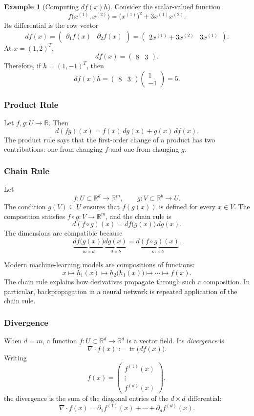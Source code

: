 \documentclass[12pt,oneside]{book}
\numberwithin{equation}{section}
\theoremstyle{definition}
\newtheorem{example}{Example}[section]
\theoremstyle{plain}
\theoremstyle{remark}
\newcommand{\R}{\mathbb{R}}
\newcommand{\tr}{\operatorname{tr}}
\begin{document}
\begin{example}[Computing $df(x)h$]
Consider the scalar-valued function
\[
f\bigl(x^{(1)},x^{(2)}\bigr)
=\bigl(x^{(1)}\bigr)^2+3x^{(1)}x^{(2)}.
\]
Its differential is the row vector
\[
df(x)
=\begin{pmatrix}\partial_1 f(x)&\partial_2 f(x)\end{pmatrix}
=\begin{pmatrix}2x^{(1)}+3x^{(2)}&3x^{(1)}\end{pmatrix}.
\]
At $x=(1,2)^T$,
\[
df(x)=\begin{pmatrix}8&3\end{pmatrix}.
\]
Therefore, if $h=(1,-1)^T$, then
\[
df(x)h
=\begin{pmatrix}8&3\end{pmatrix}
\begin{pmatrix}1\\-1\end{pmatrix}
=5.
\]
\end{example}

\subsubsection{Product Rule}
Let $f,g\colon U\to\R$. Then
\[
d(fg)(x)=f(x)\,dg(x)+g(x)\,df(x).
\]
The product rule says that the first-order change of a product has two contributions: one from changing $f$ and one from changing $g$.

\subsubsection{Chain Rule}
Let
\[
f\colon U\subset\R^d\to\R^m,
\qquad
g\colon V\subset\R^b\to U.
\]
The condition $g(V)\subseteq U$ ensures that $f(g(x))$ is defined for every $x\in V$. The composition satisfies $f\circ g\colon V\to\R^m$, and the chain rule is
\[
d(f\circ g)(x)=df\bigl(g(x)\bigr)\,dg(x).
\]
The dimensions are compatible because
\[
\underbrace{df\bigl(g(x)\bigr)}_{m\times d}
\underbrace{dg(x)}_{d\times b}
=
\underbrace{d(f\circ g)(x)}_{m\times b}.
\]

Modern machine-learning models are compositions of functions:
\[
x\longmapsto h_1(x)
\longmapsto h_2\bigl(h_1(x)\bigr)
\longmapsto\cdots\longmapsto f(x).
\]
The chain rule explains how derivatives propagate through such a composition. In particular, backpropagation in a neural network is repeated application of the chain rule.

\subsubsection{Divergence}
When $d=m$, a function $f\colon U\subset\R^d\to\R^d$ is a vector field. Its \emph{divergence} is
\[
\nabla\mathbin{\cdot}f(x):=\tr\bigl(df(x)\bigr).
\]
Writing
\[
f(x)=
\begin{pmatrix}
f^{(1)}(x)\\
\vdots\\
f^{(d)}(x)
\end{pmatrix},
\]
the divergence is the sum of the diagonal entries of the $d\times d$ differential:
\[
\nabla\mathbin{\cdot}f(x)
=\partial_1f^{(1)}(x)+\cdots+\partial_df^{(d)}(x).
\]
\end{document}
